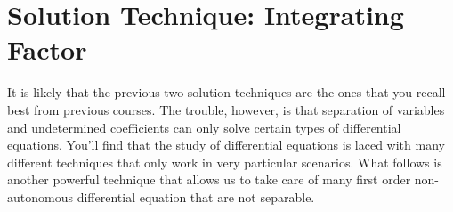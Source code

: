 % 
\newpage\section{Solution Technique: Integrating Factor}
It is likely that the previous two solution techniques are the ones that you recall best
from previous courses.  The trouble, however, is that separation of variables and
undetermined coefficients can only solve certain types of differential equations.  You'll
find that the study of differential equations is laced with many different techniques that
only work in very particular scenarios.  What follows is another powerful technique that
allows us to take care of many first order non-autonomous differential equation that are
not separable.  
